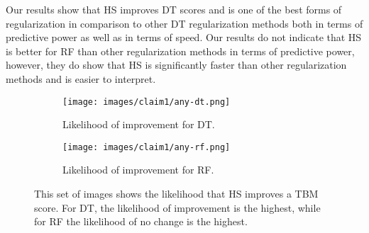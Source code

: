 Our results show that HS improves DT scores and is one of the best forms of regularization in comparison to other DT regularization methods both in terms of predictive power as well as in terms of speed. 
Our results do not indicate that HS is better for RF than other regularization methods in terms of predictive power, however, they do show that HS is significantly faster than other regularization methods and is easier to interpret.




\begin{figure}[hbt]
     \centering
     \begin{subfigure}[b]{0.43\textwidth}
         \centering
         \texttt{[image: images/claim1/any-dt.png]}
         \caption{Likelihood of improvement for DT.}
         \label{fig:claim1-dt}
     \end{subfigure}
     \hfill
     \begin{subfigure}[b]{0.43\textwidth}
         \centering
         \texttt{[image: images/claim1/any-rf.png]}
         \caption{Likelihood of improvement for RF.}
         \label{fig:claim1-rf}
     \end{subfigure}
        \caption{This set of images shows the likelihood that HS improves a TBM score. 
        For DT, the likelihood of improvement is the highest, while for RF the likelihood of no change is the highest.}
        \label{fig:claim1-improvement}
\end{figure}

